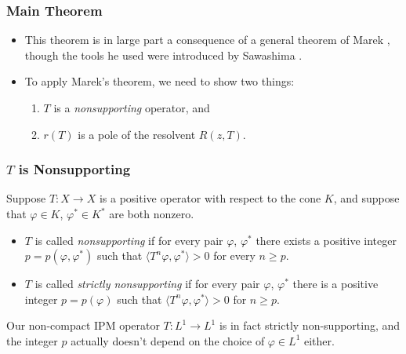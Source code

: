 \documentclass{beamer}
\begin{document}
\begin{frame}
	\frametitle{Main Theorem}
	\begin{itemize}
		\item This theorem is in large part a consequence of a general theorem of Marek \cite{Marek1970}, though the tools he used were introduced by Sawashima \cite{Sawashima1964}.
		\pause
		\item To apply Marek's theorem, we need to show two things:
		\begin{enumerate}
			\pause
			\item $T$ is a \emph{nonsupporting} operator, and
			\pause
			\item $r(T)$ is a pole of the resolvent $R(z, T)$.
		\end{enumerate}
	\end{itemize}
\end{frame}

\begin{frame}
	\frametitle{$T$ is Nonsupporting}
		\begin{definition}
			Suppose $T:X \to X$ is a positive operator with respect to the cone $K$, and suppose that $\varphi \in K$, $\varphi^* \in K^*$ are both nonzero.
			\begin{itemize}
				\pause
				\item $T$ is called \emph{nonsupporting} if for every pair $\varphi$, $\varphi^*$ there exists a positive integer $p = p(\varphi, \varphi^*)$ such that $\langle T^n \varphi, \varphi^* \rangle > 0$ for every $n \geq p$.
				\pause
				\item $T$ is called \emph{strictly nonsupporting} if for every pair $\varphi$, $\varphi^*$ there is a positive integer $p = p(\varphi)$ such that $\langle T^n \varphi, \varphi^* \rangle > 0$ for $n \geq p$.
			\end{itemize}
		\end{definition}
	\pause
	Our non-compact IPM operator $T:L^1 \to L^1$ is in fact strictly non-supporting, and the integer $p$ actually doesn't depend on the choice of $\varphi \in L^1$ either.
\end{frame}
\end{document}
